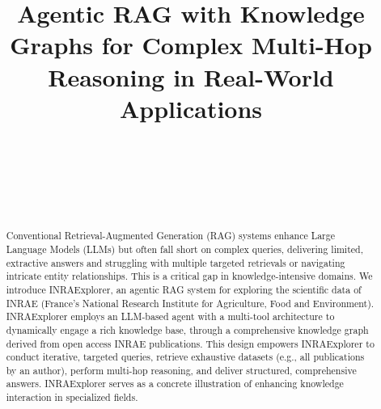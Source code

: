 \documentclass{ecai}
\begin{document}

\begin{frontmatter}


\title{Agentic RAG with Knowledge Graphs for Complex Multi-Hop Reasoning in Real-World Applications}



\author[A]{~}
\author[A]{~}
\author[A]{~}

\address[A]{Ekimetrics, France}


\begin{abstract}
Conventional Retrieval-Augmented Generation (RAG) systems enhance Large Language Models (LLMs) but often fall short on complex queries, delivering limited, extractive answers and struggling with multiple targeted retrievals or navigating intricate entity relationships. This is a critical gap in knowledge-intensive domains. We introduce INRAExplorer, an agentic RAG system for exploring the scientific data of INRAE (France's National Research Institute for Agriculture, Food and Environment). INRAExplorer employs an LLM-based agent with a multi-tool architecture to dynamically engage a rich knowledge base, through a comprehensive knowledge graph derived from open access INRAE publications. This design empowers INRAExplorer to conduct iterative, targeted queries, retrieve exhaustive datasets (e.g., all publications by an author), perform multi-hop reasoning, and deliver structured, comprehensive answers. INRAExplorer serves as a concrete illustration of enhancing knowledge interaction in specialized fields.
\end{abstract}

\end{frontmatter}
\end{document}
